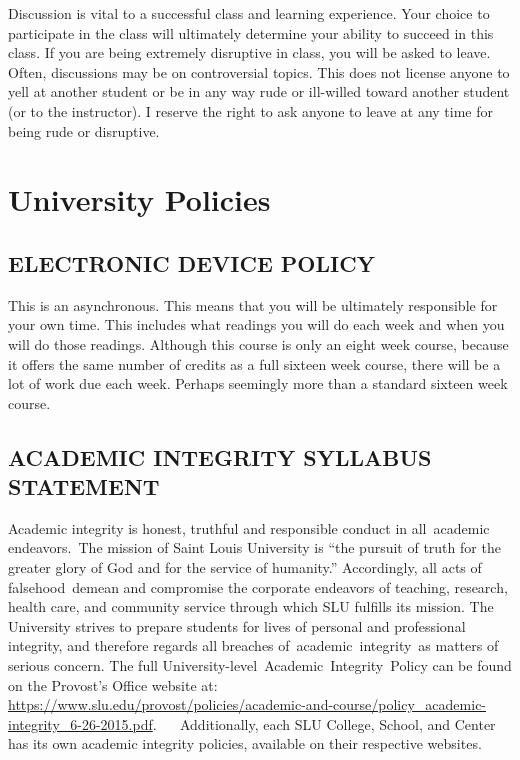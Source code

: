 \documentclass[11pt,]{article}
\begin{document}
Discussion is vital to a successful class and learning experience. Your
choice to participate in the class will ultimately determine your
ability to succeed in this class. If you are being extremely disruptive
in class, you will be asked to leave. Often, discussions may be on
controversial topics. This does not license anyone to yell at another
student or be in any way rude or ill-willed toward another student (or
to the instructor). I reserve the right to ask anyone to leave at any
time for being rude or disruptive.

\section{University Policies}\label{university-policies}

\subsection{ELECTRONIC DEVICE POLICY}\label{electronic-device-policy}

This is an asynchronous. This means that you will be ultimately
responsible for your own time. This includes what readings you will do
each week and when you will do those readings. Although this course is
only an eight week course, because it offers the same number of credits
as a full sixteen week course, there will be a lot of work due each
week. Perhaps seemingly more than a standard sixteen week course.

\subsection{ACADEMIC INTEGRITY SYLLABUS
STATEMENT}\label{academic-integrity-syllabus-statement}

Academic integrity is honest, truthful and responsible conduct in
all~academic endeavors.~The mission of Saint Louis University is ``the
pursuit of truth for the greater glory of God and for the service of
humanity.'' Accordingly, all acts of falsehood~demean and compromise the
corporate endeavors of teaching, research, health care, and community
service through which SLU fulfills its mission. The University strives
to prepare students for lives of personal and professional integrity,
and therefore regards all breaches of~academic~integrity~as matters of
serious concern. The full University-level~Academic~Integrity~Policy can
be found on the Provost's Office website at:
\url{https://www.slu.edu/provost/policies/academic-and-course/policy_academic-integrity_6-26-2015.pdf}.~
~ Additionally, each SLU College, School, and Center has its own
academic integrity policies, available on their respective websites.
\end{document}
